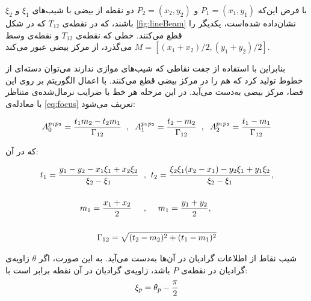 \documentclass[12pt,a4paper]{article}
\numberwithin{equation}{section}
\numberwithin{figure}{section}
\theoremstyle{definition}
\theoremstyle{theorem}
\theoremstyle{definition}
\begin{document}
با فرض این‌که 
\( P_1 = (x_1,y_1) \)
و
\( P_2= (x_2,y_2) \)
دو نقطه از بیضی با شیب‌های 
\( \xi_1 \)
و 
\( \xi_2 \)
باشند،‌ که در نقطه‌ی 
\( T_{12} \) 
که در شکل \ref{fig:lineBeam} نشان‌داده شده‌است، یکدیگر را قطع می‌کنند. خطی که نقطه‌ی 
\( T_{12} \) 
و نقطه‌ی وسط
\( M = [ (x_1 + x_2)/2 , (y_1+y_2)/2 ] \) 
می‌گذرد، از مرکز بیضی عبور می‌کند. 

بنابراین با استفاده از جفت نقاطی که شیب‌های موازی ندارند می‌توان دسته‌ای از خطوط تولید کرد که هم را در مرکز بیضی قطع می‌کنند. با اعمال الگوریتم  بر روی این فضا، مرکز بیضی به‌دست می‌آید. در این مرحله هر خط با ضرایب نرمال‌شده‌ی متناظر با معادله‌ی \ref{eq:focus} تعریف می‌شود: 

\begin{align}
A_0^{p_1 p_2} = {{t_1 m_2 - t_2 m_1} \over { \Gamma_{12} }} 
\hspace*{0.2cm}, \hspace*{0.2cm}
A_1^{p_1 p_2} = {{t_2 - m_2} \over { \Gamma_{12} }} 
\hspace*{0.2cm}, \hspace*{0.2cm} 
A_2^{p_1 p_2} = {{t_1 - m_1} \over { \Gamma_{12} }}
\end{align}
\label{eq:coefs}

که در آن: 

\begin{gather}
\begin{align*}
t_1 = { {y_1 - y_2 - x_1 \xi_1 + x_2 \xi_2 } \over {\xi_2 - \xi_1 } } 
\hspace*{0.2cm},& \hspace*{0.2cm}
t_2 = { { \xi_2 \xi_1 (x_2 - x_1) - {y_2 \xi_1} + {y_1 \xi_2} } \over {\xi_2 - \xi_1 } }, \nonumber 
\\[0.5cm]
m_1 = {{x_1 + x_2} \over 2}
\hspace*{0.5cm},& \hspace*{0.5cm}
m_1 = {{y_1 + y_2} \over 2} ,
\end{align*}
\\[0.5cm]
\Gamma_{12} = \sqrt{(t_2 - m_2)^2 + (t_1 - m_1 )^2 }
\label{eq:coefsParams}
\end{gather}

شیب نقاط از اطلاعات گرادیان در آن‌ها به‌دست می‌آید. به این صورت، اگر 
\( \theta \) 
زاویه‌ی گرادیان در نقطه‌ی
\( P \) 
باشد، زاویه‌ی گرادیان در آن نقطه برابر است با: 
\begin{equation}
\label{eq:gradTg}
\xi_p = \theta_p - { \pi \over 2}
\end{equation}
\end{document}
